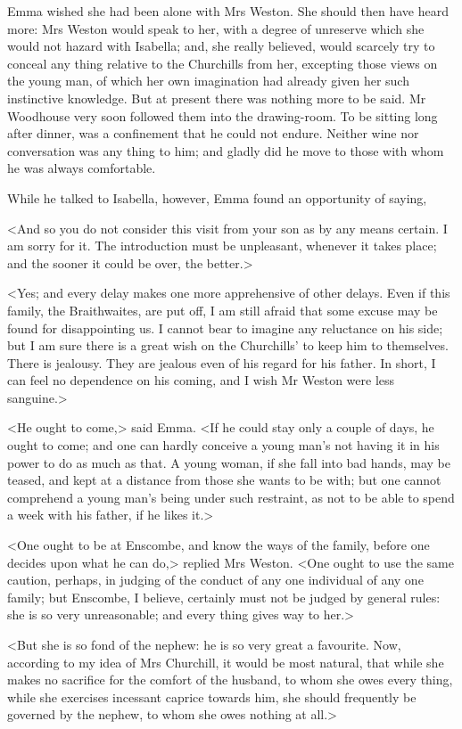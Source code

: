 Emma wished she had been alone with Mrs Weston. She should then have heard more: Mrs Weston would speak to her, with a degree of unreserve which she would not hazard with Isabella; and, she really believed, would scarcely try to conceal any thing relative to the Churchills from her, excepting those views on the young man, of which her own imagination had already given her such instinctive knowledge. But at present there was nothing more to be said. Mr Woodhouse very soon followed them into the drawing-room. To be sitting long after dinner, was a confinement that he could not endure. Neither wine nor conversation was any thing to him; and gladly did he move to those with whom he was always comfortable.

While he talked to Isabella, however, Emma found an opportunity of saying,

<And so you do not consider this visit from your son as by any means certain. I am sorry for it. The introduction must be unpleasant, whenever it takes place; and the sooner it could be over, the better.>

<Yes; and every delay makes one more apprehensive of other delays. Even if this family, the Braithwaites, are put off, I am still afraid that some excuse may be found for disappointing us. I cannot bear to imagine any reluctance on his side; but I am sure there is a great wish on the Churchills' to keep him to themselves. There is jealousy. They are jealous even of his regard for his father. In short, I can feel no dependence on his coming, and I wish Mr Weston were less sanguine.>

<He ought to come,> said Emma. <If he could stay only a couple of days, he ought to come; and one can hardly conceive a young man's not having it in his power to do as much as that. A young woman, if she fall into bad hands, may be teased, and kept at a distance from those she wants to be with; but one cannot comprehend a young man's being under such restraint, as not to be able to spend a week with his father, if he likes it.>

<One ought to be at Enscombe, and know the ways of the family, before one decides upon what he can do,> replied Mrs Weston. <One ought to use the same caution, perhaps, in judging of the conduct of any one individual of any one family; but Enscombe, I believe, certainly must not be judged by general rules: she is so very unreasonable; and every thing gives way to her.>

<But she is so fond of the nephew: he is so very great a favourite. Now, according to my idea of Mrs Churchill, it would be most natural, that while she makes no sacrifice for the comfort of the husband, to whom she owes every thing, while she exercises incessant caprice towards him, she should frequently be governed by the nephew, to whom she owes nothing at all.>

